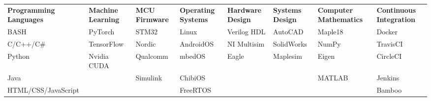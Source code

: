 
\begin{cvparagraph}

\begin{center}
  \begin{tabular}{L L L L L L L L}
  \textbf{Programming Languages} & \textbf{Machine Learning} & \textbf{MCU Firmware} & \textbf{Operating Systems} & \textbf{Hardware Design} & \textbf{Systems Design} & \textbf{Computer Mathematics} & \textbf{Continuous Integration} \\
  BASH                 & PyTorch     & STM32    & Linux     & Verilog HDL & AutoCAD    & Maple18 & Docker   \\
  C/C++/C\#            & TensorFlow  & Nordic   & AndroidOS & NI Multisim & SolidWorks & NumPy   & TravisCI \\
  Python               & Nvidia CUDA & Qualcomm & mbedOS    & Eagle       & Maplesim   & Eigen   & CircleCI \\
  Java                 &             & Simulink & ChibiOS   &             &            & MATLAB  & Jenkins  \\
  HTML/CSS/JavaScript  &             &          & FreeRTOS  &             &            &         & Bamboo   \\
  \end{tabular}
\end{center}


\end{cvparagraph}
